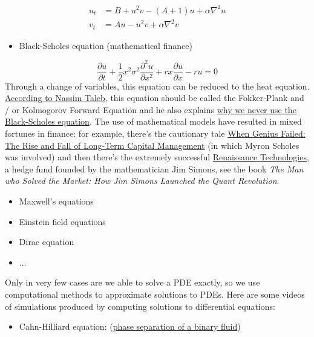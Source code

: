 \documentclass[12pt,landscape]{article}
\begin{document}
{\begin{align*}
u_t &= B + u^2 v - (A+1) u + \alpha \nabla^2 u \\ 
v_t &= Au  - u^2 v + \alpha \nabla^2 v
\end{align*}
\begin{itemize}
\item Black-Scholes equation (mathematical finance)

\end{itemize}
\[
\frac{\partial u}{\partial t} + \frac{1}{2}x^2\sigma^2 \frac{\partial^2 u}{\partial x^2} + rx \frac{\partial u}{\partial x} - ru = 0
\]
Through a change of variables, this equation can be reduced to the heat equation. \href{https://twitter.com/nntaleb/status/1596178404675551239}{According to Nassim Taleb}, this equation should be called the Fokker-Plank and / or Kolmogorov Forward Equation and he also explains \href{https://www.youtube.com/watch?v=UoGlUZPNouM}{why we never use the Black-Scholes equation}.   The use of mathematical models have resulted in mixed fortunes in finance: for example, there's the cautionary tale \href{https://en.wikipedia.org/wiki/When_Genius_Failed}{When Genius Failed: The Rise and Fall of Long-Term Capital Management} (in which Myron Scholes was involved) and then there's the extremely successful \href{https://en.wikipedia.org/wiki/Renaissance_Technologies}{Renaissance Technologies}, a hedge fund founded by the mathematician Jim Simons, see the book \emph{The Man who Solved the Market: How Jim Simons Launched the Quant Revolution}. 

\begin{itemize}
\item Maxwell's equations 


\item Einstein field equations


\item Dirac equation


\item ...

\end{itemize}
Only in very few cases are we able to solve a PDE exactly, so we use computational methods to approximate solutions to PDEs. Here are some videos of simulations produced by computing solutions to differential equations:

\begin{itemize}
\item Cahn-Hilliard equation: (\href{https://www.youtube.com/watch?v=MovUu2DwWvI}{phase separation of a binary fluid})


\end{itemize}}
\end{document}
